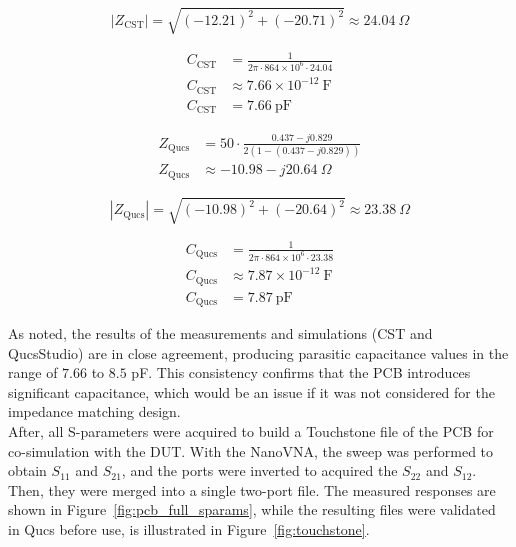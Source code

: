 \begin{equation}
|Z_{\text{CST}}| = \sqrt{(-12.21)^2 + (-20.71)^2} \approx 24.04~\Omega
\label{eq:Z_CST_module}
\end{equation}

\begin{align}
C_{\text{CST}} &= \frac{1}{2 \pi \cdot 864 \times 10^{6} \cdot 24.04} \label{eq:C_CST} \\
C_{\text{CST}}&\approx 7.66 \times 10^{-12}\ \text{F}\\
C_{\text{CST}}&= 7.66~\text{pF}
\end{align}

\begin{align}
Z_{\text{Qucs}} &= 50 \cdot \frac{0.437 - j0.829}{2\left(1 - (0.437 - j0.829)\right)} \label{eq:Z_QUCS} \\
Z_{\text{Qucs}}&\approx -10.98 - j20.64~\Omega
\end{align}

\begin{equation}
|Z_{\text{Qucs}}| = \sqrt{(-10.98)^2 + (-20.64)^2} \approx 23.38~\Omega
\label{eq:Z_QUCS_module}
\end{equation}

\begin{align}
C_{\text{Qucs}} &= \frac{1}{2 \pi \cdot 864 \times 10^{6} \cdot 23.38} \label{eq:C_QUCS} \\
C_{\text{Qucs}}&\approx 7.87 \times 10^{-12}\ \text{F} \\
C_{\text{Qucs}}&= 7.87~\text{pF}
\end{align}

\vspace{0.1em}
\indent As noted, the results of the measurements and simulations (CST and QucsStudio) are in close agreement, producing parasitic capacitance values in the range of $7.66$ to $8.5$ pF. This consistency confirms that the PCB introduces significant capacitance, which would be an issue if it was not considered for the impedance matching design\cite{Saario2003}.\\
\vspace{0.1em}
\indent After, all S-parameters were acquired to build a Touchstone file of the PCB for co-simulation with the DUT. With the NanoVNA, the sweep was performed to obtain $S_{11}$ and $S_{21}$, and the ports were inverted to acquired the $S_{22}$ and $S_{12}$. Then, they were merged into a single two-port file. The measured responses are shown in Figure~\ref{fig:pcb_full_sparams}, while the resulting files were validated in Qucs before use, is illustrated in Figure~\ref{fig:touchstone}.

